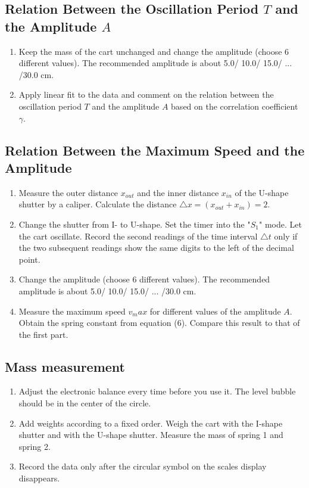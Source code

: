 \documentclass[12pt]{article}
\begin{document}
\subsection{Relation Between the Oscillation Period $T$ and the Amplitude $A$}
\begin{enumerate}
\item Keep the mass of the cart unchanged and change the amplitude (choose 6 different
values). The recommended amplitude is about 5.0/ 10.0/ 15.0/ ... /30.0 cm.
\item Apply linear fit to the data and comment on the relation between the oscillation period
$T$ and the amplitude $A$ based on the correlation coefficient $\gamma$.
\end{enumerate}
\subsection{Relation Between the Maximum Speed and the Amplitude}
\begin{enumerate}
\item Measure the outer distance $x_{out}$ and the inner distance $x_{in}$ of the U-shape shutter by
a caliper. Calculate the distance $\bigtriangleup x=(x_{out} +x_{in})=2$.
\item Change the shutter from I- to U-shape. Set the timer into the "$S_1$" mode. Let the cart
oscillate. Record the second readings of the time interval $\bigtriangleup t$ only if the two subsequent readings show the same digits to the left of the decimal point.
\item Change the amplitude (choose 6 different values). The recommended amplitude is
about 5.0/ 10.0/ 15.0/ ... /30.0 cm.
\item Measure the maximum speed $v_max$ for different values of the amplitude $A$. Obtain the
spring constant from equation (6). Compare this result to that of the first part.
\end{enumerate}
\subsection{Mass measurement}
\begin{enumerate}
\item Adjust the electronic balance every time before you use it. The level bubble should be
in the center of the circle.
\item Add weights according to a fixed order. Weigh the cart with the I-shape shutter and
with the U-shape shutter. Measure the mass of spring 1 and spring 2.
\item Record the data only after the circular symbol on the scales display disappears.
\end{enumerate}
\end{document}
